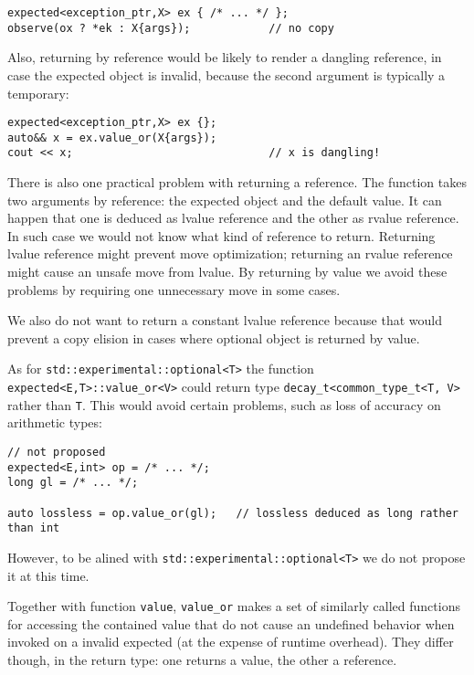 \documentclass[a4paper,10pt]{article}
\newcommand{\cpp}[1]{\lstinline{#1}}
\begin{document}
\begin{lstlisting}
expected<exception_ptr,X> ex { /* ... */ };
observe(ox ? *ek : X{args});            // no copy
\end{lstlisting}

Also, returning by reference would be likely to render a dangling reference, in case the expected object is invalid, because the second argument is typically a temporary:

\begin{lstlisting}
expected<exception_ptr,X> ex {};
auto&& x = ex.value_or(X{args});
cout << x;                              // x is dangling!
\end{lstlisting}

There is also one practical problem with returning a reference. The function takes two arguments by reference: the expected object and the default value. It can happen that one is deduced as lvalue reference and the other as rvalue reference. In such case we would not know what kind of reference to return. Returning lvalue reference might prevent move optimization; returning an rvalue reference might cause an unsafe move from lvalue. By returning by value we avoid these problems by requiring one unnecessary move in some cases.

We also do not want to return a constant lvalue reference because that would prevent a copy elision in cases where optional object is returned by value.

As for \cpp{std::experimental::optional<T>} the function \cpp{expected<E,T>::value_or<V>} could return type \cpp{decay_t<common_type_t<T, V>} rather than \cpp{T}. This would avoid certain problems, such as loss of accuracy on arithmetic types:

\begin{lstlisting}
// not proposed
expected<E,int> op = /* ... */;
long gl = /* ... */;

auto lossless = op.value_or(gl);   // lossless deduced as long rather than int
\end{lstlisting}

However, to be alined with \cpp{std::experimental::optional<T>}  we do not propose it at this time.

Together with function \cpp{value}, \cpp{value_or} makes a set of similarly called functions for accessing the contained value that do not cause an undefined behavior when invoked on a invalid expected (at the expense of runtime overhead). They differ though, in the return type: one returns a value, the other a reference.
\end{document}
